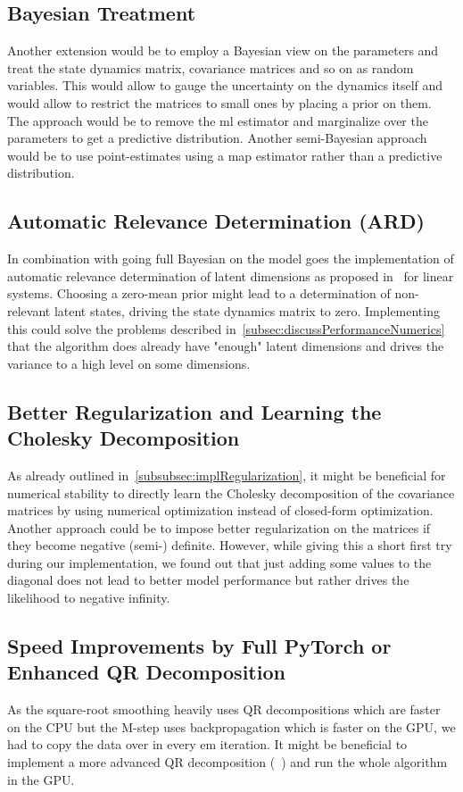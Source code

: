 	\subsection{Bayesian Treatment}
		Another extension would be to employ a Bayesian view on the parameters and treat \eg the state dynamics matrix, covariance matrices and so on as random variables. This would allow to gauge the uncertainty on the dynamics itself and would allow to restrict the matrices to small ones by placing a prior on them. The approach would be to remove the \ac{ml} estimator and marginalize over the parameters to get a predictive distribution. Another semi-Bayesian approach would be to use point-estimates using a \ac{map} estimator rather than a predictive distribution.

	\subsection{Automatic Relevance Determination (ARD)}
		\label{subsec:ard}

		In combination with going full Bayesian on the model goes the implementation of automatic relevance determination of latent dimensions as proposed in~\cite{bealVariationalKalmanSmoother2000} for linear systems. Choosing a zero-mean prior might lead to a determination of non-relevant latent states, driving the state dynamics matrix to zero. Implementing this could solve the problems described in~\autoref{subsec:discussPerformanceNumerics} that the algorithm does already have "enough" latent dimensions and drives the variance to a high level on some dimensions.

	\subsection{Better Regularization and Learning the Cholesky Decomposition}
		As already outlined in~\autoref{subsubsec:implRegularization}, it might be beneficial for numerical stability to directly learn the Cholesky decomposition of the covariance matrices by using numerical optimization instead of closed-form optimization. Another approach could be to impose better regularization on the matrices if they become negative (semi-) definite. However, while giving this a short first try during our implementation, we found out that just adding some values to the diagonal does not lead to better model performance but rather drives the likelihood to negative infinity.

	\subsection{Speed Improvements by Full PyTorch or Enhanced QR Decomposition}
		As the square-root smoothing heavily uses QR decompositions which are faster on the CPU but the M-step uses backpropagation which is faster on the GPU, we had to copy the data over in every \ac{em} iteration. It might be beneficial to implement a more advanced QR decomposition (\eg~\cite{andersonCommunicationAvoidingQRDecomposition2011a}) and run the whole algorithm in the GPU.

